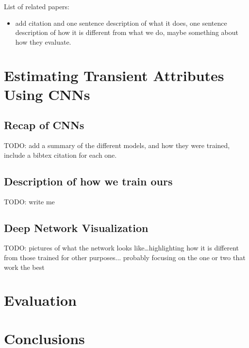 \documentclass{article}
\begin{document}
List of related papers:
\begin{itemize}

  \item add citation and one sentence description of what it does, one
    sentence description of how it is different from what we do, maybe
    something about how they evaluate.

\end{itemize}

\section{Estimating Transient Attributes Using CNNs}

\subsection{Recap of CNNs}

TODO: add a summary of the different models, and how they were
trained, include a bibtex citation for each one.

\subsection{Description of how we train ours}

TODO: write me

\subsection{Deep Network Visualization}

TODO: pictures of what the network looks like\dots highlighting how it
is different from those trained for other purposes... probably
focusing on the one or two that work the best

\section{Evaluation}

%
%
%

\section{Conclusions}
\end{document}
